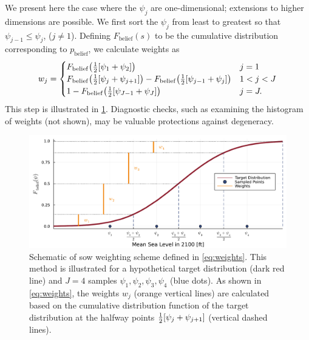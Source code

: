 \documentclass{agujournal2019}
\begin{document}
We present here the case where the $\psi_j$ are one-dimensional; extensions to higher dimensions are possible.
We first sort the $\psi_j$  from least to greatest so that $\psi_{j-1} \leq \psi_j$, ($j \neq 1$).
Defining $F_\mathrm{belief}(s)$ to be the cumulative distribution corresponding to $p_\mathrm{belief}$, we calculate weights as
\begin{equation}\label{eq:weights}
  w_j = \begin{cases}
    F_\mathrm{belief}\qty(\frac{1}{2}\qty[\psi_1 + \psi_2])                                                                     & j = 1     \\
    F_\mathrm{belief}\qty(\frac{1}{2}\qty[\psi_{j} + \psi_{j+1}]) - F_\mathrm{belief}\qty(\frac{1}{2}\qty[\psi_{j-1} + \psi_j]) & 1 < j < J \\
    1 - F_\mathrm{belief}\qty(\frac{1}{2}\qty[\psi_{J-1} + \psi_J])                                                             & j = J.
  \end{cases}
\end{equation}
This step is illustrated in \cref{fig:grid-sketch}.
Diagnostic checks, such as examining the histogram of weights (not shown), may be valuable protections against degeneracy.

\begin{figure}
  \centering
  \includegraphics[width=\textwidth]{grid-sketch}
  \caption{
    Schematic of \gls{sow} weighting scheme defined in \cref{eq:weights}.
    This method is illustrated for a hypothetical target distribution (dark red line) and $J=4$ samples $\psi_1, \psi_2, \psi_3, \psi_4$ (blue dots).
    As shown in \cref{eq:weights}, the weights $w_j$ (orange vertical lines) are calculated based on the cumulative distribution function of the target distribution at the halfway points $\frac{1}{2}\qty[\psi_j+\psi_{j+1}]$ (vertical dashed lines).
  }\label{fig:grid-sketch}
\end{figure}
\end{document}
